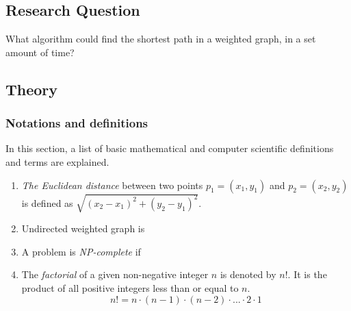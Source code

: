 \documentclass{article}
\begin{document}
\subsection{Research Question}\label{RQ}
What algorithm could find the shortest path in a weighted graph, in a set amount of time?



\subsection{Theory}\label{Theory}

\subsubsection{Notations and definitions}\label{Notation and definitions}

In this section, a list of basic mathematical and computer scientific definitions and terms are explained. 
\newline

\begin{enumerate}   %
 
  \item \textit{The Euclidean distance} between two points $p_1=(x_1,y_1)$ and $p_2=(x_2,y_2)$ is defined as $\sqrt{(x_2-x_1)^2+(y_2-y_1)^2}$. \label{Euclidean distance}
  \item Undirected weighted graph is \label{undirected weighted graph}
  \item A problem is \textit{NP-complete} if \label{NP-complete}
  \item The \textit{factorial} of a given non-negative integer $n$ is denoted by $n!$. It is the product of all positive integers less than or equal to $n$. $$n! = n \cdot (n-1) \cdot (n-2) \cdot ... \cdot 2 \cdot 1 $$\label{factorial}
\end{enumerate}
\end{document}
